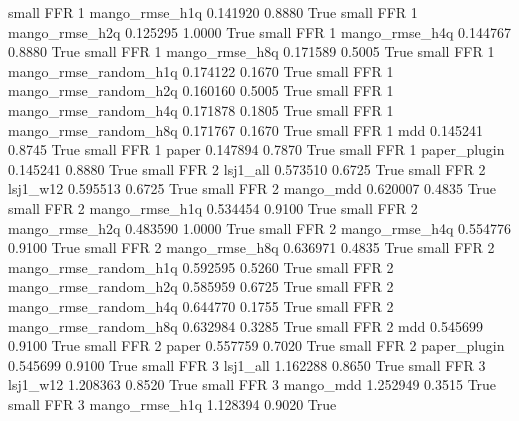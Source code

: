      small      FFR                 1        mango_rmse_h1q   0.141920      0.8880    True
     small      FFR                 1        mango_rmse_h2q   0.125295      1.0000    True
     small      FFR                 1        mango_rmse_h4q   0.144767      0.8880    True
     small      FFR                 1        mango_rmse_h8q   0.171589      0.5005    True
     small      FFR                 1 mango_rmse_random_h1q   0.174122      0.1670    True
     small      FFR                 1 mango_rmse_random_h2q   0.160160      0.5005    True
     small      FFR                 1 mango_rmse_random_h4q   0.171878      0.1805    True
     small      FFR                 1 mango_rmse_random_h8q   0.171767      0.1670    True
     small      FFR                 1                   mdd   0.145241      0.8745    True
     small      FFR                 1                 paper   0.147894      0.7870    True
     small      FFR                 1          paper_plugin   0.145241      0.8880    True
     small      FFR                 2              lsj1_all   0.573510      0.6725    True
     small      FFR                 2              lsj1_w12   0.595513      0.6725    True
     small      FFR                 2             mango_mdd   0.620007      0.4835    True
     small      FFR                 2        mango_rmse_h1q   0.534454      0.9100    True
     small      FFR                 2        mango_rmse_h2q   0.483590      1.0000    True
     small      FFR                 2        mango_rmse_h4q   0.554776      0.9100    True
     small      FFR                 2        mango_rmse_h8q   0.636971      0.4835    True
     small      FFR                 2 mango_rmse_random_h1q   0.592595      0.5260    True
     small      FFR                 2 mango_rmse_random_h2q   0.585959      0.6725    True
     small      FFR                 2 mango_rmse_random_h4q   0.644770      0.1755    True
     small      FFR                 2 mango_rmse_random_h8q   0.632984      0.3285    True
     small      FFR                 2                   mdd   0.545699      0.9100    True
     small      FFR                 2                 paper   0.557759      0.7020    True
     small      FFR                 2          paper_plugin   0.545699      0.9100    True
     small      FFR                 3              lsj1_all   1.162288      0.8650    True
     small      FFR                 3              lsj1_w12   1.208363      0.8520    True
     small      FFR                 3             mango_mdd   1.252949      0.3515    True
     small      FFR                 3        mango_rmse_h1q   1.128394      0.9020    True
